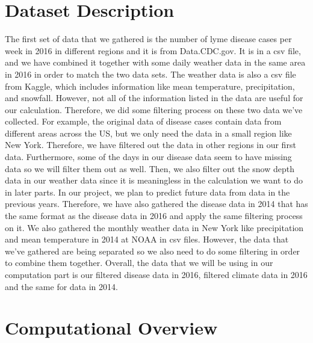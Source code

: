 \documentclass[fontsize=11pt]{article}
\begin{document}
\section*{Dataset Description}

The first set of data that we gathered is the number of lyme disease cases per week in 2016 in different regions and it is from Data.CDC.gov. It is in a csv file, and we have combined it together with some daily weather data in the same area in 2016 in order to match the two data sets. The weather data is also a csv file from Kaggle, which includes information like mean temperature, precipitation, and snowfall. However, not all of the information listed in the data are useful for our calculation. Therefore, we did some filtering process on these two data we’ve collected. For example, the original data of disease cases contain data from different areas across the US, but we only need the data in a small region like New York. Therefore, we have filtered out the data in other regions in our first data. Furthermore, some of the days in our disease data seem to have missing data so we will filter them out as well. Then, we also filter out the snow depth data in our weather data since it is meaningless in the calculation we want to do in later parts. In our project, we plan to predict future data from data in the previous years. Therefore, we have also gathered the disease data in 2014 that has the same format as the disease data in 2016 and apply the same filtering process on it.  We also gathered the monthly weather data in New York like precipitation and mean temperature in 2014 at NOAA in csv files. However, the data that we've gathered are being separated so we also need to do some filtering in order to combine them together. Overall, the data that we will be using in our computation part is our filtered disease data in 2016, filtered climate data in 2016 and the same for data in 2014.\\ 





\section*{Computational Overview}
\end{document}
